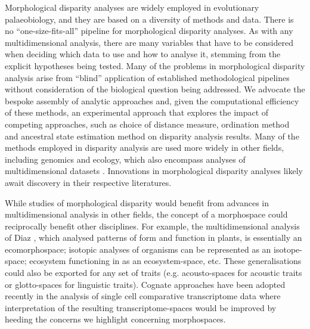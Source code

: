 \documentclass[12pt,letterpaper]{article}
\begin{document}
\noindent Morphological disparity analyses are widely employed in evolutionary palaeobiology, and they are based on a diversity of methods and data.
There is no ``one-size-fits-all'' pipeline for morphological disparity analyses.
As with any multidimensional analysis, there are many variables that have to be considered when deciding which data to use and how to analyse it, stemming from the explicit hypotheses being tested.
Many of the problems in morphological disparity analysis arise from ``blind'' application of established methodological pipelines without consideration of the biological question being addressed.
We advocate the bespoke
assembly of analytic approaches and, given the computational efficiency of these methods, an experimental approach that explores the impact of competing approaches, such as choice of distance measure, ordination method and ancestral state estimation method on disparity analysis results.
Many of the methods employed in disparity analysis are used more widely in other fields, including genomics and ecology, which also encompass analyses of multidimensional datasets
\citep{Donohue2013-bg, Saupe2015-vm, Canter2018-hk, mammola2019}
. %
Innovations in morphological disparity analyses likely await discovery in their respective literatures.

While studies of morphological disparity would benefit from advances in multidimensional analysis in other fields, the concept of a morphospace could reciprocally benefit other disciplines.
For example, the multidimensional analysis of Diaz \citealt{Diaz2016-mr}, which analysed patterns of form and function in plants, is essentially an ecomorphospace; isotopic analyses of organisms \citep{Jackson2011-kq} can be represented as an isotope-space; ecosystem functioning in \citealt{Donohue2013-bg} as an ecosystem-space, etc.
These generalisations could also be exported for any set of traits (e.g. acousto-spaces for acoustic traits or glotto-spaces for linguistic traits).
Cognate approaches have been adopted recently in the analysis of single cell comparative transcriptome data \citep{Sebe-Pedros2018-sw} where interpretation of the resulting transcriptome-spaces would be improved by heeding the concerns we highlight concerning morphospaces.
\end{document}
